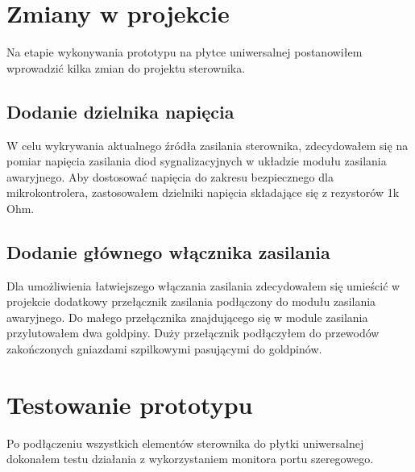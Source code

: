 \documentclass[11pt]{report}
\begin{document}
 \section{Zmiany w projekcie}
 Na etapie wykonywania prototypu na płytce uniwersalnej postanowiłem wprowadzić kilka zmian do projektu sterownika.
 \subsection{Dodanie dzielnika napięcia}
 W celu wykrywania aktualnego źródła zasilania sterownika, zdecydowałem się na pomiar napięcia zasilania diod sygnalizacyjnych w układzie modułu zasilania awaryjnego. Aby dostosować napięcia do zakresu bezpiecznego dla mikrokontrolera, zastosowałem dzielniki napięcia składające się z rezystorów 1k Ohm.
 \subsection{Dodanie głównego włącznika zasilania}
 Dla umożliwienia łatwiejszego włączania zasilania zdecydowałem się umieścić w projekcie dodatkowy przełącznik zasilania podłączony do modułu zasilania awaryjnego. Do małego przełącznika znajdującego się w module zasilania przylutowałem dwa goldpiny. Duży przełącznik podłączyłem do przewodów zakończonych gniazdami szpilkowymi pasującymi do goldpinów.

 \section{Testowanie prototypu}
 Po podłączeniu wszystkich elementów sterownika do płytki uniwersalnej dokonałem testu działania z wykorzystaniem monitora portu szeregowego.
 
\end{document}
